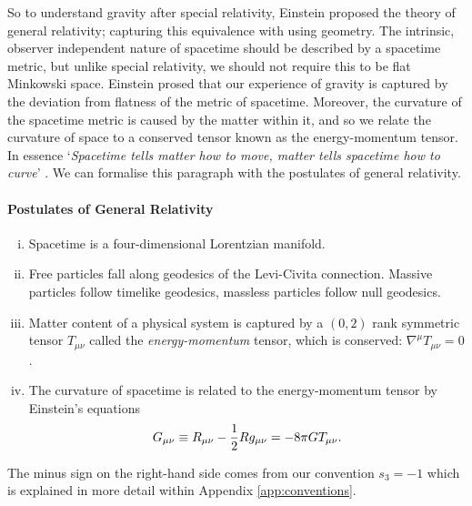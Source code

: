 So to understand gravity after special relativity, Einstein proposed the theory of general relativity; capturing this equivalence with using geometry. The intrinsic, observer independent nature of spacetime should be described by a spacetime metric, but unlike special relativity, we should not require this to be flat Minkowski space. Einstein prosed that our experience of gravity is captured by the deviation from flatness of the metric of spacetime. Moreover, the curvature of the spacetime metric is caused by the matter within it, and so we relate the curvature of space to a conserved tensor known as the energy-momentum tensor. In essence `\emph{Spacetime tells matter how to move, matter tells spacetime how to curve}' \cite{Misner:1974qy}. We can formalise this paragraph with the postulates of general relativity.
\paragraph{Postulates of General Relativity}
\begin{enumerate}[(i)]
	\item Spacetime is a four-dimensional Lorentzian manifold.
	\item Free particles fall along geodesics of the Levi-Civita connection. Massive particles follow timelike geodesics, massless particles follow null geodesics.
	\item Matter content of a physical system is captured by a $(0,2)$ rank symmetric tensor $T_{\mu \nu}$ called the \emph{energy-momentum} tensor, which is conserved: $\nabla^\mu T_{\mu \nu} = 0$.
	\item The curvature of spacetime is related to the energy-momentum tensor by Einstein's equations
	\begin{equation}
	\label{eq:einstein}
		G_{\mu \nu} \equiv R_{\mu \nu} - \frac{1}{2} R g_{\mu \nu} = - 8 \pi G T_{\mu \nu}.
	\end{equation}
\end{enumerate}
The minus sign on the right-hand side comes from our convention $s_3 = -1$ which is explained in more detail within Appendix \ref{app:conventions}. 

